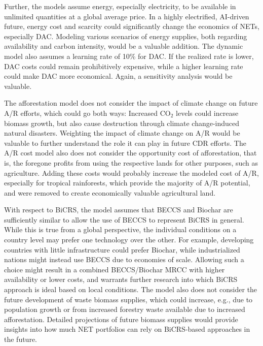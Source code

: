 Further, the models assume energy, especially electricity, to be available in unlimited quantities at a global average price. In a highly electrified, AI-driven future, energy cost and scarcity could significantly change the economics of NETs, especially DAC. Modeling various scenarios of energy supplies, both regarding availability and carbon intensity, would be a valuable addition. The dynamic model also assumes a learning rate of 10\% for DAC. If the realized rate is lower, DAC costs could remain prohibitively expensive, while a higher learning rate could make DAC more economical. Again, a sensitivity analysis would be valuable.\vspace{2mm}

The afforestation model does not consider the impact of climate change on future A/R efforts, which could go both ways: Increased CO$_2$ levels could increase biomass growth, but also cause destruction through climate change-induced natural disasters. Weighting the impact of climate change on A/R would be valuable to further understand the role it can play in future CDR efforts. The A/R cost model also does not consider the opportunity cost of afforestation, that is, the foregone profits from using the respective lands for other purposes, such as agriculture. Adding these costs would probably increase the modeled cost of A/R, especially for tropical rainforests, which provide the majority of A/R potential, and were removed to create economically valuable agricultural land.\vspace{2mm}

With respect to BiCRS, the model assumes that BECCS and Biochar are sufficiently similar to allow the use of BECCS to represent BiCRS in general. While this is true from a global perspective, the individual conditions on a country level may prefer one technology over the other. For example, developing countries with little infrastructure could prefer Biochar, while industrialized nations might instead use BECCS due to economies of scale. Allowing such a choice might result in a combined BECCS/Biochar MRCC with higher availability or lower costs, and warrants further research into which BiCRS approach is ideal based on local conditions. The model also does not consider the future development of waste biomass supplies, which could increase, e.g., due to population growth or from increased forestry waste available due to increased afforestation. Detailed projections of future biomass supplies would provide insights into how much NET portfolios can rely on BiCRS-based approaches in the future.\vspace{2mm}


